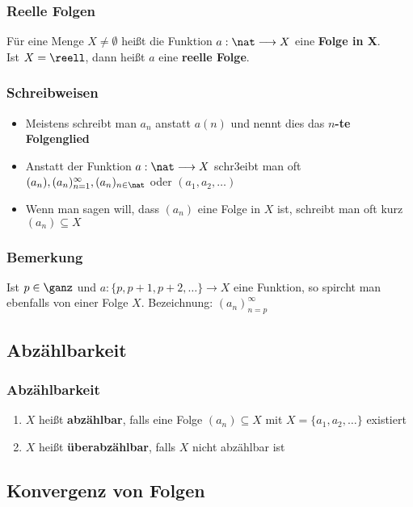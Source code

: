 \documentclass{kit}
\begin{document}
    \subsubsection{Reelle Folgen}
      Für eine Menge $X\neq\emptyset$ heißt die Funktion $a:\nat\longrightarrow X$ eine \textbf{Folge in X}.\\
      Ist $X=\reell$, dann heißt $a$ eine \textbf{reelle Folge}.
    \subsubsection{Schreibweisen}
      \begin{itemize}
        \item Meistens schreibt man $a_n$ anstatt $a(n)$ und nennt dies das \textbf{$n$-te Folgenglied}
        \item Anstatt der Funktion $a:\nat\longrightarrow X$ schr3eibt man oft $(a_n),(a_n)^{\infty}_{n=1},(a_n)_{n\in\nat}$ oder $(a_1,a_2,\dots)$
        \item Wenn man sagen will, dass $(a_n)$ eine Folge in $X$ ist, schreibt man oft kurz $(a_n)\subseteq X$
      \end{itemize}
    \subsubsection{Bemerkung}
      Ist $p\in\ganz$ und $a:\{p,p+1,p+2,\dots\}\longrightarrow X$ eine Funktion, so spircht man ebenfalls von einer Folge $X$. Bezeichnung: $(a_n)^\infty_{n=p}$
  \subsection{Abzählbarkeit}
    \subsubsection{Abzählbarkeit}
      \begin{enumerate}
        \item $X$ heißt \textbf{abzählbar}, falls eine Folge $(a_n)\subseteq X$ mit $X=\{a_1,a_2,\dots\}$ existiert
        \item $X$ heißt \textbf{überabzählbar}, falls $X$ nicht abzählbar ist
      \end{enumerate}
  \subsection{Konvergenz von Folgen}
\end{document}
